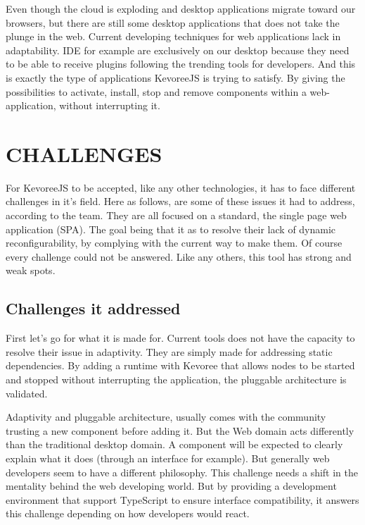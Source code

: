 \documentclass{aes2e}
\begin{document}
Even though the cloud is exploding and desktop applications migrate toward our browsers, but there are still some desktop applications that does not take the plunge in the web. Current developing techniques for web applications lack in adaptability. IDE for example are exclusively on our desktop because they need to be able to receive plugins following the trending tools for developers. And this is exactly the type of applications KevoreeJS is trying to satisfy. By giving the possibilities to activate, install, stop and remove components within a web-application, without interrupting it.

\section{CHALLENGES}

For KevoreeJS to be accepted, like any other technologies, it has to face different challenges in it's field. Here as follows, are some of these issues it had to address, according to the team\cite{DEK1}. They are all focused on a standard, the single page web application (SPA). The goal being that it as to resolve their lack of dynamic reconfigurability, by complying with the current way to make them.
Of course every challenge could not be answered. Like any others, this tool has strong and weak spots.

\subsection{Challenges it addressed}
First let's go for what it is made for. Current tools does not have the capacity to resolve their issue in adaptivity. They are simply made for addressing static dependencies. By adding a runtime with Kevoree that allows nodes to be started and stopped without interrupting the application, the pluggable architecture is validated.
\linebreak
 
Adaptivity and pluggable architecture, usually comes with the community trusting a new component before adding it. But the Web domain acts differently than the traditional desktop domain. A component will be expected to clearly explain what it does (through an interface for example). But generally web developers seem to have a different philosophy\cite{DEK1}. This challenge needs a shift in the mentality behind the web developing world. But by providing a development environment that support TypeScript to ensure interface compatibility, it answers this challenge depending on how developers would react.
\linebreak
 
\end{document}
